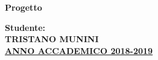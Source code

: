 \documentclass{article}
\begin{document}
\begin{titlepage}
 	\centering
  \Huge{\textbf{Progetto}}\\
 	[30mm]
  \raggedright
  \Large{\textbf{Studente:}}\\
  \Large{\textbf{TRISTANO MUNINI}}\\
 	[90mm]
 	\centering
  \LARGE{\underline{\textbf{ANNO ACCADEMICO 2018-2019}}}\\
\end{titlepage}



\tableofcontents
\thispagestyle{empty}
\cleardoublepage
\setcounter{page}{1}






\cleardoublepage



\cleardoublepage


\end{document}
